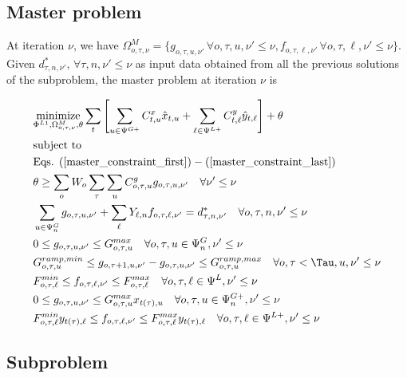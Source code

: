 \subsection{Master problem}

At iteration $\nu$, we have $\Omega_{o, \tau, \nu}^{M} = \{ g_{o, \tau, u, \nu'} \, \forall o, \tau, u, \nu' \leq \nu, f_{o, \tau, \ell, \nu'} \, \forall o, \tau, \ell, \nu' \leq \nu \}$. Given $d_{\tau, n, \nu'}^*, \, \forall \tau, n, \nu' \leq \nu$ as input data obtained from all the previous solutions of the subproblem, the master problem at iteration $\nu$ is

\begin{align}
&\label{master_obj} \underset{\Phi^{L1}, \Omega_{o, \tau, \nu}^{M}, \theta}{\text{minimize}} \sum\limits_{t} \left[ \sum\limits_{u \in \Psi^{G+}} C^x_{t, u} \hat{x}_{t, u} + \sum\limits_{\ell \in \Psi^{L+}} C^y_{t, \ell} \hat{y}_{t, \ell} \right] + \theta \\
&\text{subject to} \nonumber \\
&\text{Eqs. } (\ref{master_constraint_first}) - (\ref{master_constraint_last}) \\
&\theta \geq \sum\limits_o W_o \sum\limits_{\tau} \sum\limits_{u} C_{o, \tau, u}^g g_{o, \tau, u, \nu'} \quad \forall \nu' \leq \nu \\
&\sum\limits_{u \in \Psi^G_{n}} g_{o, \tau, u, \nu'} + \sum\limits_{\ell} Y_{\ell, n} f_{o, \tau, \ell, \nu'} = d_{\tau, n, \nu'}^* \quad \forall o, \tau, n, \nu' \leq \nu \\
&0 \leq g_{o, \tau, u, \nu'} \leq G_{o, \tau, u}^{max} \quad \forall o, \tau, u \in \Psi_n^G, \nu' \leq \nu \\
&G^{ramp,min}_{o, \tau, u} \leq g_{o, \tau + 1, u, \nu'} - g_{o, \tau, u, \nu'} \leq G^{ramp,max}_{o, \tau, u} 	\quad \forall o, \tau < \Tau, u, \nu' \leq \nu \\
&F_{o, \tau, \ell}^{min} \leq f_{o, \tau, \ell, \nu'} \leq F_{o, \tau, \ell}^{max} \quad \forall o, \tau, \ell \in \Psi^L, \nu' \leq \nu \\
&0 \leq g_{o, \tau, u, \nu'} \leq G_{o, \tau, u}^{max} x_{t(\tau), u} \quad \forall o, \tau, u \in \Psi_n^{G+}, \nu' \leq \nu \\
&F_{o, \tau, \ell}^{min} y_{t(\tau), \ell} \leq f_{o, \tau, \ell, \nu'} \leq F_{o, \tau, \ell}^{max} y_{t(\tau), \ell} \quad \forall o, \tau, \ell \in \Psi^{L+}, \nu' \leq \nu
\end{align}

\subsection{Subproblem}

